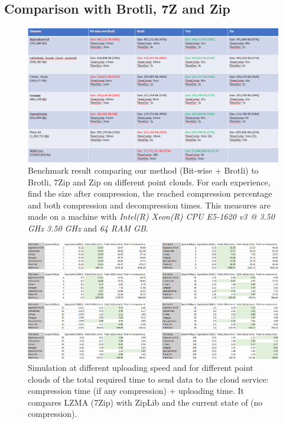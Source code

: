 \subsection{Comparison with Brotli, 7Z and Zip}
\label{subsc:compression-benchmark}
\begin{figure}
    \includegraphics[width=\textwidth]{img/bit-wise-benchmark.png}
    \caption{Benchmark result comparing our method (Bit-wise + Brotli) to Brotli, 7Zip and Zip on different point clouds. For each experience, find the size after compression, the reached compression percentage and both compression and decompression times. This measures are made on a machine with \emph{Intel(R) Xeon(R) CPU E5-1620 v3 @ 3.50 GHz 3.50 GHz} and \emph{64 RAM GB}.}
    \label{fig:bit-wise-benchmark}
\end{figure}

\begin{figure}
    \includegraphics[width=\textwidth]{img/compare1.png}
    \caption{Simulation at different uploading speed and for different point clouds of the total required time to send data to the cloud service: compression time (if any compression) + uploading time. It compares LZMA (7Zip) with ZipLib and the current state of \CC (no compression).}
    \label{fig:compare-excel}
\end{figure}

